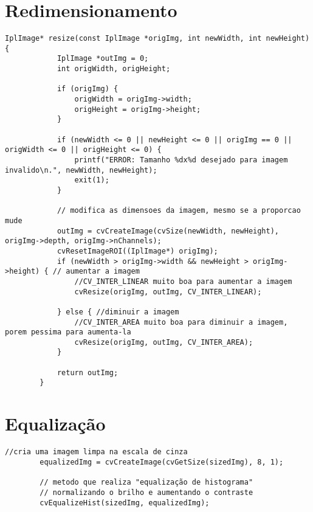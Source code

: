 \section{Redimensionamento}

	\begin{lstlisting}[caption=Redimensionamento de uma imagem., label=list:resize]
		IplImage* resize(const IplImage *origImg, int newWidth, int newHeight) {
			IplImage *outImg = 0;
			int origWidth, origHeight;

			if (origImg) {
				origWidth = origImg->width;
				origHeight = origImg->height;
			}

			if (newWidth <= 0 || newHeight <= 0 || origImg == 0 || origWidth <= 0 || origHeight <= 0) {
				printf("ERROR: Tamanho %dx%d desejado para imagem invalido\n.", newWidth, newHeight);
				exit(1);
			}

			// modifica as dimensoes da imagem, mesmo se a proporcao mude
			outImg = cvCreateImage(cvSize(newWidth, newHeight), origImg->depth, origImg->nChannels);
			cvResetImageROI((IplImage*) origImg);
			if (newWidth > origImg->width && newHeight > origImg->height) { // aumentar a imagem
				//CV_INTER_LINEAR muito boa para aumentar a imagem
				cvResize(origImg, outImg, CV_INTER_LINEAR); 

			} else { //diminuir a imagem
				//CV_INTER_AREA muito boa para diminuir a imagem, porem pessima para aumenta-la
				cvResize(origImg, outImg, CV_INTER_AREA);
			}

			return outImg;
		}
	\end{lstlisting}

\section{Equalização}

	\begin{lstlisting}[caption=Equalização de uma imagem., label=list:equalizacao]
		//cria uma imagem limpa na escala de cinza
		equalizedImg = cvCreateImage(cvGetSize(sizedImg), 8, 1); 

		// metodo que realiza "equalização de histograma"
		// normalizando o brilho e aumentando o contraste
		cvEqualizeHist(sizedImg, equalizedImg);
	\end{lstlisting}	

